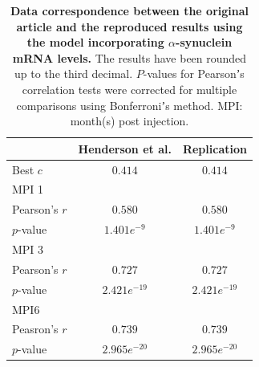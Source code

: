 \begin{table}[ht]
  \begin{center}
    \centering
   
    \begin{tabular}{|l|c|c|} %
      \hline
      
      &\textbf{Henderson et al.} & \textbf{Replication} \hspace{1cm}\\

      \hline
      Best $c$ & $0.414$ & $0.414$ \\
      MPI 1 & &\\
            \hspace{1cm} Pearson's $r$ & $0.580$ & $0.580$\\
            \hspace{1cm} $p$-value & $1.401e^{-9}$ & $1.401e^{-9}$ \\ 

      MPI 3 & &\\
            \hspace{1cm} Pearson's $r$ & $0.727$ & $0.727$ \\
            \hspace{1cm} $p$-value & $2.421e^{-19}$ & $2.421e^{-19}$   \\
            
      MPI6& &\\
            \hspace{1cm} Peasron's $r$ & $0.739$ & $0.739$ \\
            \hspace{1cm} $p$-value & $2.965e^{-20}$ & $2.965e^{-20}$  \\
      \hline
    \end{tabular}
    
    \caption{\textbf{Data correspondence between the original article and the reproduced results using the model incorporating $\alpha$-synuclein mRNA levels.} The results have been rounded up to the third decimal. $P$-values for Pearsonʼs correlation tests were corrected for multiple comparisons using Bonferroniʼs method. MPI: month(s) post injection.}
  \end{center}
\end{table}


